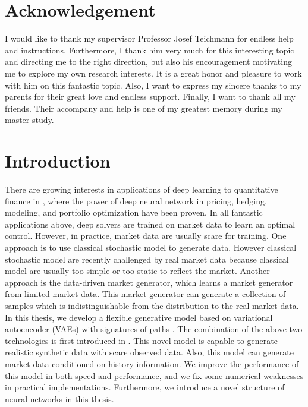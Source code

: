 \documentclass[12pt]{report}
\theoremstyle{definition}
\theoremstyle{remark}
\begin{document}
\tableofcontents
\chapter*{Acknowledgement}
I would like to thank my supervisor Professor Josef Teichmann for endless help and instructions. Furthermore, I thank him very much for this interesting topic and directing me to the right direction, but also his encouragement motivating me to explore my own research interests. It is a great honor and pleasure to work with him on this fantastic topic. Also, I want to express my sincere thanks to my parents for their great love and endless support. Finally, I want to thank all my friends. Their accompany and help is one of my greatest memory during my master study.    

\chapter{Introduction}\label{introduction}
There are growing interests in applications of deep learning to quantitative finance in \cite{bayerdeep, buehler2019deep, cuchiero2020generative, cont2004recovering, henry2019martingale, horvath2019deep, ruf2020neural, zhang2019stock}, where the power of deep neural network in pricing, hedging, modeling, and portfolio optimization have been proven. In all fantastic applications above, deep solvers are trained on market data to learn an optimal control. However, in practice, market data are usually scare for training. One approach is to use classical stochastic model to generate data. However classical stochastic model are recently challenged by real market data because classical model are usually too simple or too static to reflect the market. Another approach is the data-driven market generator, which learns a market generator from limited market data. This market generator can generate a collection of samples which is indistinguishable from the distribution to the real market data. In this thesis, we develop a flexible generative model based on variational autoencoder (VAEs) \cite{kingma2019introduction} with signatures of paths \cite{friz2020course}. The combination of the above two technologies is first introduced in \cite{buehler2020data}. This novel model is capable to generate realistic synthetic data with scare observed data. Also, this model can generate market data conditioned on history information. We improve the performance of this model in both speed and performance, and we fix some numerical weaknesses in practical implementations. Furthermore, we introduce a novel structure of neural networks in this thesis.  
\end{document}
